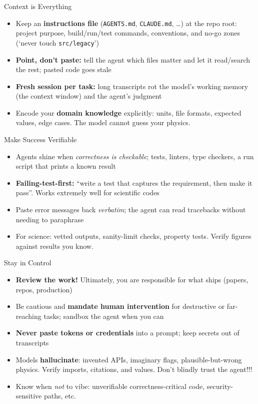 \documentclass[10pt,aspectratio=169]{beamer}
\begin{document}
\begin{frame}{Context is Everything}
  \begin{itemize}
    \item Keep an \textbf{instructions file} (\texttt{AGENTS.md},
      \texttt{CLAUDE.md}, \dots) at the repo root:
      project purpose, build/run/test commands, conventions, and
      no-go zones (\enquote*{never touch \texttt{src/legacy}})
      \pause
    \item \textbf{Point, don't paste:} tell the agent which files matter
      and let it read/search the rest; pasted code goes stale
      \pause
    \item \textbf{Fresh session per task:} long transcripts rot the
      model's working memory (the context window) and the agent's judgment
      \pause
    \item Encode your \textbf{domain knowledge} explicitly: units, file
      formats, expected values, edge cases. The model cannot guess
      your physics.
  \end{itemize}
\end{frame}

\begin{frame}{Make Success Verifiable}
  \begin{itemize}
    \item Agents shine when \emph{correctness is checkable}; tests,
      linters, type checkers, a run script that prints a known result
      \pause
    \item \textbf{Failing-test-first:} \enquote{write a test that captures the
      requirement, then make it pass}. Works extremely well for scientific
      codes
      \pause
    \item Paste error messages back \emph{verbatim}; the agent can read
      tracebacks without needing to paraphrase
      \pause
    \item For science: vetted outputs, sanity-limit checks, property tests.
      Verify figures against results you know.
  \end{itemize}
\end{frame}

\begin{frame}{Stay in Control}
  \begin{itemize}
    \item \textbf{Review the work!} Ultimately, you are responsible for what
      ships (papers, repos, production)
      \pause
    \item Be cautious and \textbf{mandate human intervention} for destructive or
      far-reaching tasks; sandbox the agent when you can
      \pause
    \item \textbf{Never paste tokens or credentials} into a prompt;
      keep secrets out of transcripts
      \pause
    \item Models \textbf{hallucinate}: invented APIs, imaginary flags,
      plausible-but-wrong physics. Verify imports, citations, and
      values. Don't blindly trust the agent!!!
      \pause
    \item Know when \emph{not} to vibe: unverifiable correctness-critical
      code, security-sensitive paths, etc.
  \end{itemize}
\end{frame}
\end{document}
